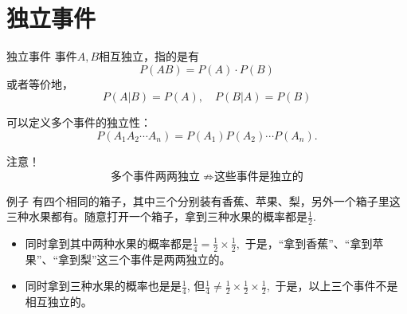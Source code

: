 


\section{独立事件}


\begin{frame}

\begin{block}{独立事件}
事件$A,B$相互独立，指的是有
\[P(AB) = P(A)\cdot P(B)\]
或者等价地，
\[P(A|B) = P(A), \quad P(B|A) = P(B)\]

\vspace{1em}
\pause

可以定义多个事件的独立性：
\[P(A_1A_2\cdots A_n) = P(A_1)P(A_2)\cdots P(A_n).\]

\vspace{1em}
\pause

{\color{red}注意}！
\[\text{多个事件两两独立} \; \not\Rightarrow \text{这些事件是独立的}\]
\end{block}

\end{frame}


\begin{frame}

\begin{block}{例子}
有四个相同的箱子，其中三个分别装有香蕉、苹果、梨，另外一个箱子里这三种水果都有。随意打开一个箱子，拿到三种水果的概率都是$\frac{1}{2}$.
\begin{itemize}
\item 同时拿到其中两种水果的概率都是$\frac{1}{4} = \frac{1}{2} \times \frac{1}{2},$ 于是，``拿到香蕉''、``拿到苹果''、``拿到梨''这三个事件是两两独立的。
\item 同时拿到三种水果的概率也是是$\frac{1}{4}$, 但$\frac{1}{4} \neq \frac{1}{2} \times \frac{1}{2} \times \frac{1}{2},$ 于是，以上三个事件不是相互独立的。
\end{itemize}
\end{block}

\end{frame}

